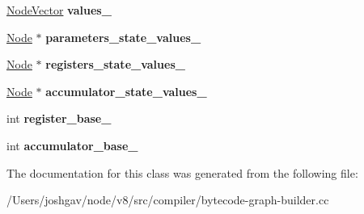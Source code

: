 \begin{DoxyCompactItemize}
\item 
\hyperlink{classv8_1_1internal_1_1_zone_vector}{Node\+Vector} {\bfseries values\+\_\+}\hypertarget{classv8_1_1internal_1_1compiler_1_1_bytecode_graph_builder_1_1_environment_acae9109c2a8da994c960275dc77826fd}{}\label{classv8_1_1internal_1_1compiler_1_1_bytecode_graph_builder_1_1_environment_acae9109c2a8da994c960275dc77826fd}

\item 
\hyperlink{classv8_1_1internal_1_1compiler_1_1_node}{Node} $\ast$ {\bfseries parameters\+\_\+state\+\_\+values\+\_\+}\hypertarget{classv8_1_1internal_1_1compiler_1_1_bytecode_graph_builder_1_1_environment_a05c33b7100992aaa94ea774b23293b19}{}\label{classv8_1_1internal_1_1compiler_1_1_bytecode_graph_builder_1_1_environment_a05c33b7100992aaa94ea774b23293b19}

\item 
\hyperlink{classv8_1_1internal_1_1compiler_1_1_node}{Node} $\ast$ {\bfseries registers\+\_\+state\+\_\+values\+\_\+}\hypertarget{classv8_1_1internal_1_1compiler_1_1_bytecode_graph_builder_1_1_environment_a59ec94cb81d50481be4775298a5fc275}{}\label{classv8_1_1internal_1_1compiler_1_1_bytecode_graph_builder_1_1_environment_a59ec94cb81d50481be4775298a5fc275}

\item 
\hyperlink{classv8_1_1internal_1_1compiler_1_1_node}{Node} $\ast$ {\bfseries accumulator\+\_\+state\+\_\+values\+\_\+}\hypertarget{classv8_1_1internal_1_1compiler_1_1_bytecode_graph_builder_1_1_environment_a4b1d6148d58b9b1b2b1217385a1a33e2}{}\label{classv8_1_1internal_1_1compiler_1_1_bytecode_graph_builder_1_1_environment_a4b1d6148d58b9b1b2b1217385a1a33e2}

\item 
int {\bfseries register\+\_\+base\+\_\+}\hypertarget{classv8_1_1internal_1_1compiler_1_1_bytecode_graph_builder_1_1_environment_a0e8418d610a41f743353435a650ee448}{}\label{classv8_1_1internal_1_1compiler_1_1_bytecode_graph_builder_1_1_environment_a0e8418d610a41f743353435a650ee448}

\item 
int {\bfseries accumulator\+\_\+base\+\_\+}\hypertarget{classv8_1_1internal_1_1compiler_1_1_bytecode_graph_builder_1_1_environment_a59c9ff6b1791bbed4e0cdd44a8cebd44}{}\label{classv8_1_1internal_1_1compiler_1_1_bytecode_graph_builder_1_1_environment_a59c9ff6b1791bbed4e0cdd44a8cebd44}

\end{DoxyCompactItemize}


The documentation for this class was generated from the following file\+:\begin{DoxyCompactItemize}
\item 
/\+Users/joshgav/node/v8/src/compiler/bytecode-\/graph-\/builder.\+cc\end{DoxyCompactItemize}

